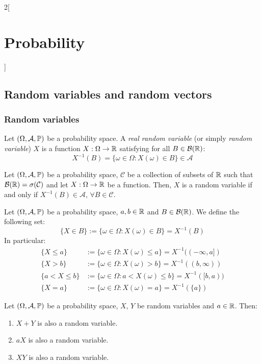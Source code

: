 \documentclass[../../../main_math.tex]{subfiles}
\begin{document}
\begin{multicols}{2}[\section{Probability}]
  \subsection{Random variables and random vectors}
  \subsubsection{Random variables}
  \begin{definition}
    Let $(\Omega,\mathcal{A},\mathbb{P})$ be a probability space. A \emph{real random variable} (or simply \emph{random variable}) $X$ is a function $X:\Omega\rightarrow\mathbb{R}$ satisfying for all $B\in\mathcal{B}(\mathbb{R})$: $$X^{-1}(B)=\{\omega\in\Omega:X(\omega)\in B\}\in\mathcal{A}$$
  \end{definition}
  \begin{proposition}
    Let $(\Omega,\mathcal{A},\mathbb{P})$ be a probability space, $\mathcal{C}$ be a collection of subsets of $\mathbb{R}$ such that $\mathcal{B}(\mathbb{R})=\sigma(\mathcal{C})$ and let $X:\Omega\rightarrow\mathbb{R}$ be a function. Then, $X$ is a random variable if and only if $X^{-1}(B)\in\mathcal{A}$, $\forall B\in \mathcal{C}$.
  \end{proposition}
  \begin{definition}
    Let $(\Omega,\mathcal{A},\mathbb{P})$ be a probability space, $a,b\in\mathbb{R}$ and $B\in\mathcal{B}(\mathbb{R})$. We define the following set:
    $$\{X\in B\}:=\{\omega\in\Omega:X(\omega)\in B\}=X^{-1}(B)$$
    In particular:
    \begin{align*}
      \{X\leq a\}   & :=\{\omega\in\Omega:X(\omega)\leq a\}=X^{-1}((-\infty,a]) \\
      \{X> b\}      & :=\{\omega\in\Omega:X(\omega)>b\}=X^{-1}((b,\infty))      \\
      \{a<X\leq b\} & :=\{\omega\in\Omega:a< X(\omega)\leq b\}=X^{-1}([b,a))    \\
      \{X=a\}       & :=\{\omega\in\Omega:X(\omega)=a\}=X^{-1}(\{a\})
    \end{align*}
  \end{definition}
  \begin{proposition}
    Let $(\Omega,\mathcal{A},\mathbb{P})$ be a probability space, $X$, $Y$ be random variables and $a\in\mathbb{R}$. Then:
    \begin{enumerate}
      \item $X+Y$ is also a random variable.
      \item $aX$ is also a random variable.
      \item $XY$ is also a random variable.

\end{enumerate}
\end{proposition}
\end{multicols}
\end{document}

